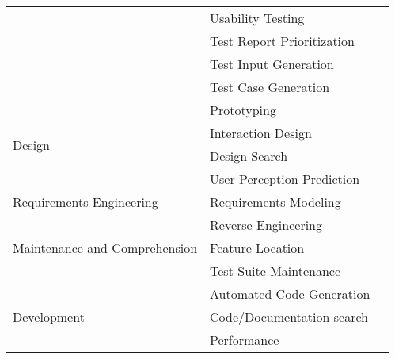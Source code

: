 \begin{table}[t]
\begin{threeparttable}
\begin{tabular}{p{2.7cm} p{2.9cm} p{2.6cm}}
			& Usability Testing & \cite{Deka-2016-UIST, Deka-2017-UIST} \\ 
			& Test Report Prioritization & \cite{Feng-2016-ASE} \\ 
			& Test Input Generation & \cite{Patric-2016-ASE} \\ 
			& Test Case Generation & \cite{Zhang-2017-ASE} \\ 
			\midrule
			\multirow{4}{*}{Design} & Prototyping & \cite{Li-2010-CHI} \\ 
			& Interaction Design & \cite{Deka-2016-UIST, Deka-2017-UIST, Bao-2017-EMSE} \\ 
			& Design Search & \cite{Deka-2016-UIST, Deka-2017-UIST} \\ 
			& User Perception Prediction & \cite{Deka-2016-UIST, Deka-2017-UIST} \\ 
			\midrule
			Requirements Engineering & Requirements Modeling & \cite{Li-2010-CHI, Scharf-2013-ICSE} \\ 
			\midrule
			\multirow{3}{2.7cm}{Maintenance and Comprehension}
			 & Reverse Engineering & \cite{Nguyen-2015-ASE, Deka-2016-UIST, Deka-2017-UIST, Bajammal-2018-ICST} \\ 
			& Feature Location & \cite{Burg-2015-UIST} \\ 
			& Test Suite Maintenance & \cite{Leotta-2018-STVR} \\ 
			\midrule
			\multirow{3}{2.7cm}{Development} & Automated Code Generation & \cite{Nguyen-2015-ASE, Deka-2016-UIST, Deka-2017-UIST, Reiss-2018-ASEj} \\ 
			& Code/Documentation search & \cite{Ponzanelli-2016-ICSE, Bao-2017-EMSE, Reiss-2018-ASEj} \\ 
			& Performance & \cite{Wan-2017-STVR} \\
			\bottomrule
		\end{tabular}
		\egroup
	\end{threeparttable}
	\label{table:software-engineering-tasks}
\end{table}
